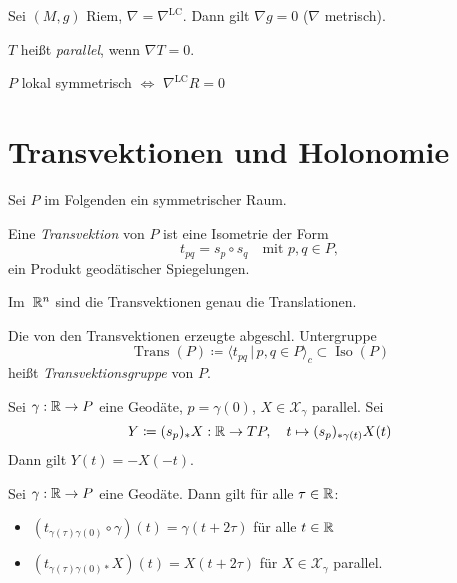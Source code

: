 \documentclass{cheat-sheet}
\DeclareMathOperator{\Iso}{Iso} %
\DeclareMathOperator{\Trans}{Trans} %
\newcommand{\LC}{\nabla^{\mathrm{LC}}} %
\newcommand{\VF}{\mathcal{X}} %
\begin{document}
\begin{bsp}
  Sei $(M, g)$ Riem, $\nabla = \LC$. Dann gilt $\nabla g = 0$ ($\nabla$ metrisch).
\end{bsp}

\begin{defn}
  $T$ heißt \emph{parallel}, wenn $\nabla T = 0$.
\end{defn}

\begin{satz}
  $P$ lokal symmetrisch $\iff$ $\LC R = 0$
\end{satz}


\section{Transvektionen und Holonomie}

\begin{nota}
  Sei $P$ im Folgenden ein symmetrischer Raum.
\end{nota}

\begin{defn}
  Eine \emph{Transvektion} von $P$ ist eine Isometrie der Form
  \[ t_{pq} = s_p \circ s_q \quad \text{mit } p, q \in P, \]
  \dh{} ein Produkt geodätischer Spiegelungen.
\end{defn}

\begin{bsp}
  Im~$\mathbb{R}^n$ sind die Transvektionen genau die Translationen.
\end{bsp}

\begin{defn}
  Die von den Transvektionen erzeugte abgeschl. Untergruppe
  \[
    \Trans(P) \coloneqq \langle t_{pq} \,|\, p, q \in P \rangle_{c}
    \subset \Iso(P)
  \]
  heißt \emph{Transvektionsgruppe} von $P$.
\end{defn}

\begin{lem}
  Sei $\gamma : \mathbb{R} \to P$ eine Geodäte, $p = \gamma(0)$, $X \in \VF_\gamma$ parallel. Sei
  \[
    Y \coloneqq (s_p)_* X : \mathbb{R} \to TP, \quad
    t \mapsto (s_p)_{*\gamma(t)} X(t)
  \]
  Dann gilt $Y(t) = -X(-t)$.
\end{lem}

\begin{lem}
  Sei $\gamma : \mathbb{R} \to P$ eine Geodäte. Dann gilt für alle $\tau \in \mathbb{R}$:
  \begin{itemize}
    \item $(t_{\gamma(\tau)\gamma(0)} \circ \gamma)(t) = \gamma(t + 2\tau)$ für alle $t \in \mathbb{R}$
    \item $(t_{\gamma(\tau)\gamma(0)*} X)(t) = X(t + 2 \tau)$ für $X \in \VF_\gamma$ parallel.
  \end{itemize}
\end{lem}
\end{document}
